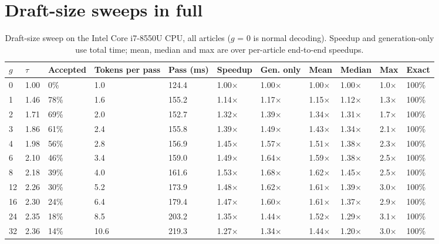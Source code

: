 \documentclass[11pt,a4paper]{article}
\begin{document}
\section{Draft-size sweeps in full}
\begin{table}[H]
\centering
\small
\caption{Draft-size sweep on the Intel Core i7-8550U CPU, all articles ($g$ = 0 is normal decoding). Speedup and generation-only use total time; mean, median and max are over per-article end-to-end speedups.}
\setlength{\tabcolsep}{4pt}
\begin{tabular}{L{0.81cm}L{0.90cm}L{1.54cm}L{1.36cm}L{1.17cm}L{1.45cm}L{1.26cm}L{1.08cm}L{1.26cm}L{1.08cm}L{1.08cm}}
\toprule
\textbf{$g$} & \textbf{$\tau$} & \textbf{Accepted} & \textbf{Tokens per pass} & \textbf{Pass (ms)} & \textbf{Speedup} & \textbf{Gen. only} & \textbf{Mean} & \textbf{Median} & \textbf{Max} & \textbf{Exact} \\
 & 1.00 & 0\% & 1.0 & 124.4 & 1.00$\times$ & 1.00$\times$ & 1.00$\times$ & 1.00$\times$ & 1.0$\times$ & 100\% \\
1 & 1.46 & 78\% & 1.6 & 155.2 & 1.14$\times$ & 1.17$\times$ & 1.15$\times$ & 1.12$\times$ & 1.3$\times$ & 100\% \\
2 & 1.71 & 69\% & 2.0 & 152.7 & 1.32$\times$ & 1.39$\times$ & 1.34$\times$ & 1.31$\times$ & 1.7$\times$ & 100\% \\
3 & 1.86 & 61\% & 2.4 & 155.8 & 1.39$\times$ & 1.49$\times$ & 1.43$\times$ & 1.34$\times$ & 2.1$\times$ & 100\% \\
4 & 1.98 & 56\% & 2.8 & 156.9 & 1.45$\times$ & 1.57$\times$ & 1.51$\times$ & 1.38$\times$ & 2.3$\times$ & 100\% \\
6 & 2.10 & 46\% & 3.4 & 159.0 & 1.49$\times$ & 1.64$\times$ & 1.59$\times$ & 1.38$\times$ & 2.5$\times$ & 100\% \\
8 & 2.18 & 39\% & 4.0 & 161.6 & 1.53$\times$ & 1.68$\times$ & 1.62$\times$ & 1.45$\times$ & 2.5$\times$ & 100\% \\
12 & 2.26 & 30\% & 5.2 & 173.9 & 1.48$\times$ & 1.62$\times$ & 1.61$\times$ & 1.39$\times$ & 3.0$\times$ & 100\% \\
16 & 2.30 & 24\% & 6.4 & 179.4 & 1.47$\times$ & 1.60$\times$ & 1.61$\times$ & 1.37$\times$ & 2.9$\times$ & 100\% \\
24 & 2.35 & 18\% & 8.5 & 203.2 & 1.35$\times$ & 1.44$\times$ & 1.52$\times$ & 1.29$\times$ & 3.1$\times$ & 100\% \\
32 & 2.36 & 14\% & 10.6 & 219.3 & 1.27$\times$ & 1.34$\times$ & 1.44$\times$ & 1.20$\times$ & 3.0$\times$ & 100\% \\
\bottomrule
\end{tabular}
\end{table}
\end{document}
